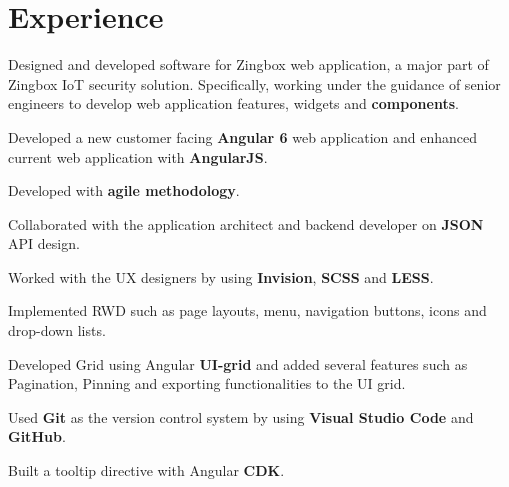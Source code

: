 \documentclass[letterpaper]{deedy-resume} %
\begin{document}
\begin{minipage}[t]{0.66\textwidth} %

\section{Experience}

\vspace{\topsep} %
\vspace{\topsep}
\begin{tightitemize}
	\item Designed and developed software for Zingbox web application, a major part of Zingbox IoT security solution. Specifically, working under the guidance of senior engineers to develop web application features, widgets and \textbf{components}.
	\item Developed a new customer facing \textbf{Angular 6} web application and enhanced current web application with \textbf{AngularJS}.
	\item Developed with \textbf{agile methodology}.
	\item Collaborated with the application architect and backend developer on \textbf{JSON} API design.
	\item Worked with the UX designers by using \textbf{Invision}, \textbf{SCSS} and \textbf{LESS}.
	\item Implemented RWD such as page layouts, menu, navigation buttons, icons and drop-down lists.
	\item Developed Grid using Angular\textbf{ UI-grid} and added several features such as Pagination, Pinning and exporting functionalities to the UI grid.
	\item Used\textbf{ Git} as the version control system by using \textbf{Visual Studio Code} and\textbf{ GitHub}.
	\item Built a tooltip directive with Angular \textbf{CDK}.
\end{tightitemize}
\sectionspace


\end{minipage}
\end{document}
